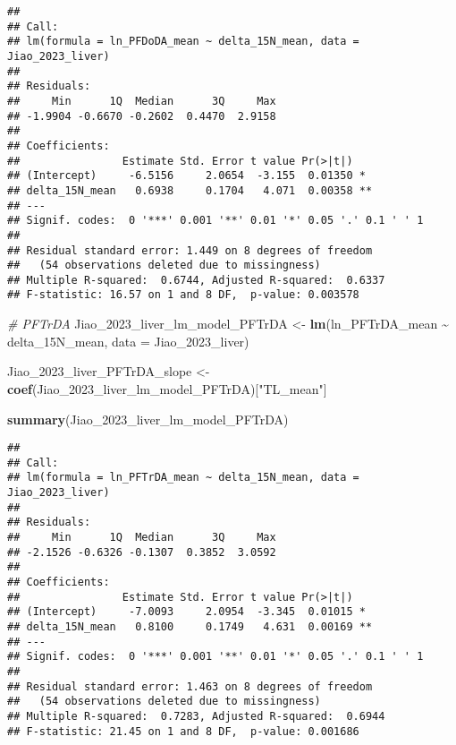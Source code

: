 \documentclass[
]{article}
\newenvironment{Shaded}{\begin{snugshade}}{\end{snugshade}}
\newcommand{\AttributeTok}[1]{\textcolor[rgb]{0.13,0.29,0.53}{#1}}
\newcommand{\CommentTok}[1]{\textcolor[rgb]{0.56,0.35,0.01}{\textit{#1}}}
\newcommand{\FunctionTok}[1]{\textcolor[rgb]{0.13,0.29,0.53}{\textbf{#1}}}
\newcommand{\NormalTok}[1]{#1}
\newcommand{\OtherTok}[1]{\textcolor[rgb]{0.56,0.35,0.01}{#1}}
\newcommand{\SpecialCharTok}[1]{\textcolor[rgb]{0.81,0.36,0.00}{\textbf{#1}}}
\newcommand{\StringTok}[1]{\textcolor[rgb]{0.31,0.60,0.02}{#1}}
\begin{document}
\begin{verbatim}
## 
## Call:
## lm(formula = ln_PFDoDA_mean ~ delta_15N_mean, data = Jiao_2023_liver)
## 
## Residuals:
##     Min      1Q  Median      3Q     Max 
## -1.9904 -0.6670 -0.2602  0.4470  2.9158 
## 
## Coefficients:
##                Estimate Std. Error t value Pr(>|t|)   
## (Intercept)     -6.5156     2.0654  -3.155  0.01350 * 
## delta_15N_mean   0.6938     0.1704   4.071  0.00358 **
## ---
## Signif. codes:  0 '***' 0.001 '**' 0.01 '*' 0.05 '.' 0.1 ' ' 1
## 
## Residual standard error: 1.449 on 8 degrees of freedom
##   (54 observations deleted due to missingness)
## Multiple R-squared:  0.6744, Adjusted R-squared:  0.6337 
## F-statistic: 16.57 on 1 and 8 DF,  p-value: 0.003578
\end{verbatim}

\begin{Shaded}
\begin{Highlighting}[]
\CommentTok{\# PFTrDA}
\NormalTok{Jiao\_2023\_liver\_lm\_model\_PFTrDA }\OtherTok{\textless{}{-}} \FunctionTok{lm}\NormalTok{(ln\_PFTrDA\_mean }\SpecialCharTok{\textasciitilde{}}\NormalTok{ delta\_15N\_mean,}
                                    \AttributeTok{data =}\NormalTok{ Jiao\_2023\_liver)}

\NormalTok{Jiao\_2023\_liver\_PFTrDA\_slope }\OtherTok{\textless{}{-}} \FunctionTok{coef}\NormalTok{(Jiao\_2023\_liver\_lm\_model\_PFTrDA)[}\StringTok{"TL\_mean"}\NormalTok{]}

\FunctionTok{summary}\NormalTok{(Jiao\_2023\_liver\_lm\_model\_PFTrDA)}
\end{Highlighting}
\end{Shaded}

\begin{verbatim}
## 
## Call:
## lm(formula = ln_PFTrDA_mean ~ delta_15N_mean, data = Jiao_2023_liver)
## 
## Residuals:
##     Min      1Q  Median      3Q     Max 
## -2.1526 -0.6326 -0.1307  0.3852  3.0592 
## 
## Coefficients:
##                Estimate Std. Error t value Pr(>|t|)   
## (Intercept)     -7.0093     2.0954  -3.345  0.01015 * 
## delta_15N_mean   0.8100     0.1749   4.631  0.00169 **
## ---
## Signif. codes:  0 '***' 0.001 '**' 0.01 '*' 0.05 '.' 0.1 ' ' 1
## 
## Residual standard error: 1.463 on 8 degrees of freedom
##   (54 observations deleted due to missingness)
## Multiple R-squared:  0.7283, Adjusted R-squared:  0.6944 
## F-statistic: 21.45 on 1 and 8 DF,  p-value: 0.001686
\end{verbatim}
\end{document}
